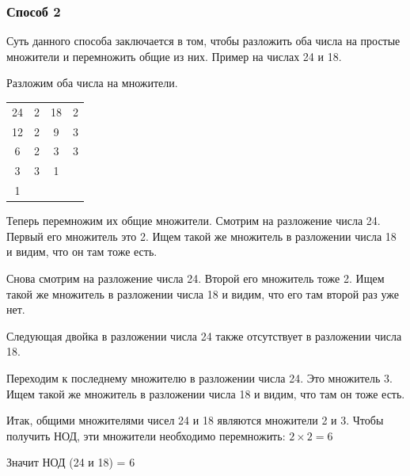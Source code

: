 \documentclass[12pt]{article}
\begin{document}
\subsubsection{Способ 2}
Суть данного способа заключается в том, чтобы разложить оба числа на простые множители и перемножить общие из них. Пример на числах 24 и 18.\par
Разложим оба числа на множители.\par
\begin{tabular}{c|cc|c}
    24 & 2 & 18 & 2 \\
    12 & 2 & 9  & 3 \\
    6  & 2 & 3  & 3 \\
    3  & 3 & 1      \\
    1
\end{tabular}\par
Теперь перемножим их общие множители. Смотрим на разложение числа 24. Первый его множитель это 2. Ищем такой же множитель в разложении числа 18 и видим, что он там тоже есть.\par
Снова смотрим на разложение числа 24. Второй его множитель тоже 2. Ищем такой же множитель в разложении числа 18 и видим, что его там второй раз уже нет.\par
Следующая двойка в разложении числа 24 также отсутствует в разложении числа 18.\par
Переходим к последнему множителю в разложении числа 24. Это множитель 3. Ищем такой же множитель в разложении числа 18 и видим, что там он тоже есть.\par
Итак, общими множителями чисел 24 и 18 являются множители 2 и 3. Чтобы получить НОД, эти множители необходимо перемножить: $2 \times 2 = 6$\par
Значит НОД (24 и 18) = 6\par
\end{document}
